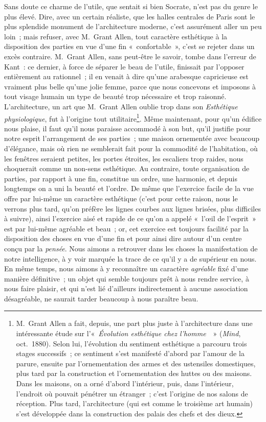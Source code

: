 \documentclass[french,twoside]{book} %
\begin{document}
Sans doute ce charme de l’utile, que sentait si bien Socrate, n’est pas du genre le plus élevé. Dire, avec un certain réaliste, que les halles centrales de Paris sont le plus splendide monument de l’architecture moderne,  c’est assurément aller un peu loin ; mais refuser, avec M. Grant Allen, tout caractère esthétique à la disposition des parties en vue d’une fin « confortable », c’est se rejeter dans un excès contraire. M. Grant Allen, sans peut-être le savoir, tombe dans l’erreur de Kant : ce dernier, à force de séparer le beau de l’utile, finissait par l’opposer entièrement au rationnel ; il en venait à dire qu’une arabesque capricieuse est vraiment plus belle qu’une jolie femme, parce que nous concevons et imposons à tout visage humain un type de beauté trop nécessaire et trop raisonné. L’architecture, un art que M. Grant Allen oublie trop dans son \emph{Esthétique physiologique}, fut à l’origine tout utilitaire\footnote{M. Grant Allen a fait, depuis, une part plus juste à l’architecture dans une intéressante étude sur l’« \emph{Évolution esthétique chez l’homme}  » (\emph{Mind}, oct. 1880). Selon lui, l’évolution du sentiment esthétique a parcouru trois stages successifs ; ce sentiment s’est manifesté d’abord par l’amour de la parure, ensuite par l’ornementation des armes et des ustensiles domestiques, plus tard par la construction et l’ornementation des huttes ou des maisons. Dans les maisons, on a orné d’abord l’intérieur, puis, dans l’intérieur, l’endroit où pouvait pénétrer un étranger ; c’est l’origine de nos salons de réception. Plus tard, l’architecture (qui est comme le troisième art humain) s’est développée dans la construction des palais des chefs et des dieux.}. Même maintenant, pour qu’un édifice nous plaise, il faut qu’il nous paraisse accommodé à son but, qu’il justifie pour notre esprit l’arrangement de ses parties ; une maison ornementée avec beaucoup d’élégance, mais où rien ne semblerait fait pour la commodité de l’habitation, où les fenêtres seraient petites, les portes étroites, les escaliers trop raides, nous choquerait comme un non-sens esthétique. Au contraire, toute organisation de parties,  par rapport à une fin, constitue un ordre, une harmonie, et depuis longtemps on a uni la beauté et l’ordre. De même que l’exercice facile de la vue offre par lui-même un caractère esthétique (c’est pour cette raison, nous le verrons plus tard, qu’on préfère les lignes courbes aux lignes brisées, plus difficiles à suivre), ainsi l’exercice aisé et rapide de ce qu’on a appelé « l’œil de l’esprit » est par lui-même agréable et beau ; or, cet exercice est toujours facilité par la disposition des choses en vue d’une fin et pour ainsi dire autour d’un centre conçu par la \emph{pensée}. Nous aimons a retrouver dans les choses la manifestation de notre intelligence, à y voir marquée la trace de ce qu’il y a de supérieur en nous. En même temps, nous aimons à y reconnaître un caractère \emph{agréable} fixé d’une manière définitive ; un objet qui semble toujours prêt à nous rendre service, à nous faire plaisir, et qui n’est lié d’ailleurs indirectement à aucune association désagréable, ne saurait tarder beaucoup à nous paraître beau.\par
\end{document}

